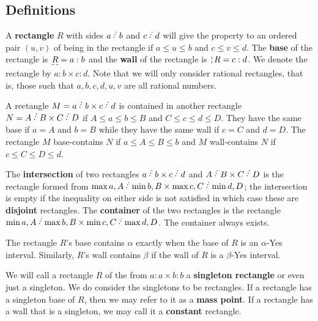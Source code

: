 \documentclass[12pt]{article}
\begin{document}
\subsection{Definitions}

A \textbf{rectangle} $R$ with sides $a \lte b$ and $c \lte d$ will give the property to an ordered pair $(u, v)$ of being in the rectangle if $a \leq u \leq b$ and $c \leq v \leq d$. The \textbf{base} of the rectangle is $\base{R} = a:b$ and the \textbf{wall} of the rectangle is $\wall{R} = c:d$. We denote the rectangle by $a:b \times c:d$. Note that we will only consider rational rectangles, that is, those such that $a, b, c, d, u, v$ are all rational numbers. 

A rectangle $M = a \lte b \times c \lte d$ is contained in another rectangle $N = A \lte B \times C \lte D$ if $A \leq a \leq b \leq B$ and $C \leq c \leq d \leq D$. They have the same base if $a=A$ and $b=B$ while they have the same wall if $c=C$ and $d=D$. The rectangle $M$ base-contains $N$ if $a \leq A \leq B \leq b$ and $M$ wall-contains $N$ if $c \leq C \leq D \leq d$.

The \textbf{intersection} of two rectangles $a \lte b \times c \lte d$ and $A \lte B \times C \lte D$ is the rectangle formed from $\max{a,A} \lte \min{b,B} \times \max{c, C} \lte \min{d, D}$; the intersection is empty if the inequality on either side is not satisfied in which case these are \textbf{disjoint} rectangles. The \textbf{container} of the two rectangles is the rectangle $\min{a,A} \lte \max{b,B} \times \min{c, C} \lte \max{d, D}$. The container always exists. 

The rectangle $R$'s base contains $\alpha$ exactly when the base of $R$ is an $\alpha$-Yes interval. Similarly, $R$'s wall contains $\beta$ if the wall of $R$ is a $\beta$-Yes interval.

We will call a rectangle $R$ of the from $a:a\times b:b$ a \textbf{singleton rectangle} or even just a singleton. We do consider the singletons to be rectangles. If a rectangle has a singleton base of $R$, then we may refer to it as a \textbf{mass point}. If a rectangle has a wall that is a singleton, we may call it a \textbf{constant} rectangle. 
\end{document}
